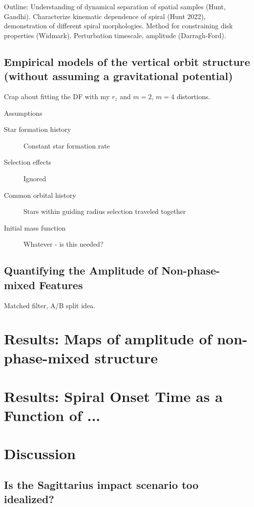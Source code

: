 Outline: Understanding of dynamical separation of spatial samples (Hunt, Gandhi). Characterize kinematic dependence of spiral (Hunt 2022), demonstration of different spiral morphologies. Method for constraining disk properties (Widmark). Perturbation timescale, amplitude (Darragh-Ford).

\subsection{Empirical models of the vertical orbit structure (without assuming a gravitational potential)}
\label{sec:zvz-model}

Crap about fitting the DF with my $r_z$ and $m=2$, $m=4$ distortions.

Assumptions

\begin{description}
    \item[Star formation history] Constant star formation rate
    \item[Selection effects] Ignored
    \item[Common orbital history] Stars within guiding radius selection traveled together
    \item[Initial mass function] Whatever - is this needed?
\end{description}


\subsection{Quantifying the Amplitude of Non-phase-mixed Features}
\label{sec:residuals}

Matched filter, A/B split idea.

\section{Results: Maps of amplitude of non-phase-mixed structure}
\label{sec:results-maps}

\section{Results: Spiral Onset Time as a Function of ...}
\label{sec:results-spiral-time}


\section{Discussion} \label{sec:discussion}

\subsection{Is the Sagittarius impact scenario too idealized?}
\label{sec:sag-impact}

